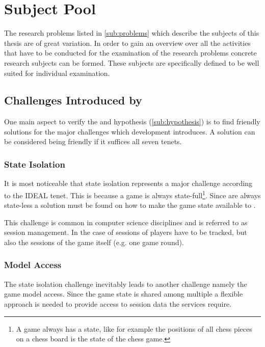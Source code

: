 \section{Subject Pool}
\label{sec:subject_pool}

The research problems listed in \autoref{sub:problems} which describe the
subjects of this thesis are of great variation. In order to gain an overview
over all the activities that have to be conducted for the examination of the
research problems concrete research subjects can be formed. These subjects are
specifically defined to be well suited for individual examination.

\subsection{Challenges Introduced by \mss{}}
\label{sub:ms_challenges}

One main aspect to verify the \ogs{} and \mss{} hypothesis
(\autoref{sub:hypothesis}) is to find \ms{} friendly solutions for the major
challenges which \og{} development introduces. A solution can be considered
being \ms{} friendly if it suffices all seven \ms{} tenets.

\subsubsection{State Isolation}

It is most noticeable that \ms{} state isolation represents a major challenge
according to the IDEAL tenet. This is because a game is always
state-full\footnote{A game always has a state, like for example the positions of
all chess pieces on a chess board is the state of the chess game.}. Since \mss{}
are always state-less a solution must be found on how to make the game state
available to \mss{}.

This challenge is common in computer science disciplines and is referred to as
session management. In the case of \ogs{} sessions of players have to be
tracked, but also the sessions of the game itself (e.g. one game round).

\subsubsection{Model Access}

The state isolation challenge inevitably leads to another challenge namely the
game model access. Since the game state is shared among multiple \mss{} a
flexible approach is needed to provide access to session data the services
require.

